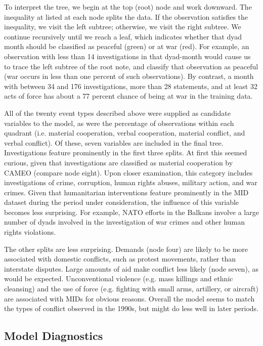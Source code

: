 \documentclass[12pt,letterpaper]{article}
\begin{document}
To interpret the tree, we begin at the top (root) node and work downward. The inequality at listed at each node splits the data. If the observation satisfies the inequality, we visit the left subtree; otherwise, we visit the right subtree. We continue recursively until we reach a leaf, which indicates whether that dyad month should be classified as peaceful (green) or at war (red). For example, an observation with less than 14 investigations in that dyad-month would cause us to trace the left subtree of the root note, and classify that observation as peaceful (war occurs in less than one percent of such observations). By contrast, a month with between 34 and 176 investigations, more than 28 statements, and at least 32 acts of force has about a 77 percent chance of being at war in the training data. 

All of the twenty event types described above were supplied as candidate variables to the model, as were the percentage of observations within each quadrant (i.e. material cooperation, verbal cooperation, material conflict, and verbal conflict). Of these, seven variables are included in the final tree. Investigations feature prominently in the first three splits. At first this seemed curious, given that investigations are classified as material cooperation by CAMEO (compare node eight). Upon closer examination, this category includes investigations of crime, corruption, human rights abuses, military action, and war crimes. Given that humanitarian interventions feature prominently in the MID dataset during the period under consideration, the influence of this variable becomes less surprising. For example, NATO efforts in the Balkans involve a large number of dyads involved in the investigation of war crimes and other human rights violations. 

The other splits are less surprising. Demands (node four) are likely to be more associated with domestic conflicts, such as protest movements, rather than interstate disputes. Large amounts of aid make conflict less likely (node seven), as would be expected. Unconventional violence (e.g. mass killings and ethnic cleansing) and the use of force (e.g. fighting with small arms, artillery, or aircraft) are associated with MIDs for obvious reasons. Overall the model seems to match the types of conflict observed in the 1990s, but might do less well in later periods. 

\subsection{Model Diagnostics}
\end{document}
